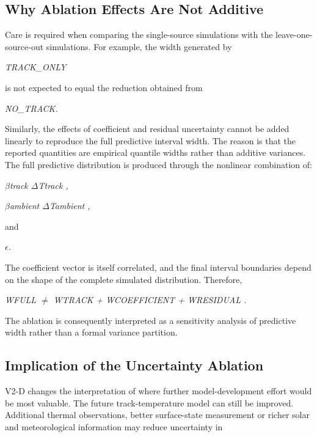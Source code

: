 \subsection{Why Ablation Effects Are Not Additive}
Care is required when comparing the single-source simulations with the leave-one-source-out simulations. For example, the width generated by

\begin{center}\textit{TRACK\_ONLY}\end{center}

is not expected to equal the reduction obtained from

\begin{center}\textit{NO\_TRACK.}\end{center}

Similarly, the effects of coefficient and residual uncertainty cannot be added linearly to reproduce the full predictive interval width. The reason is that the reported quantities are empirical quantile widths rather than additive variances. The full predictive distribution is produced through the nonlinear combination of:

\begin{center}\textit{\ensuremath{\beta}track \ensuremath{\Delta}Ttrack ,}\end{center}

\begin{center}\textit{\ensuremath{\beta}ambient \ensuremath{\Delta}Tambient ,}\end{center}

and

\begin{center}\textit{\ensuremath{\epsilon}.}\end{center}

The coefficient vector is itself correlated, and the final interval boundaries depend on the shape of the complete simulated distribution. Therefore,

\begin{center}\textit{WFULL \ensuremath{\neq} WTRACK + WCOEFFICIENT + WRESIDUAL .}\end{center}

The ablation is consequently interpreted as a sensitivity analysis of predictive width rather than a formal variance partition.

\subsection{Implication of the Uncertainty Ablation}
V2-D changes the interpretation of where further model-development effort would be most valuable. The future track-temperature model can still be improved. Additional thermal observations, better surface-state measurement or richer solar and meteorological information may reduce uncertainty in

